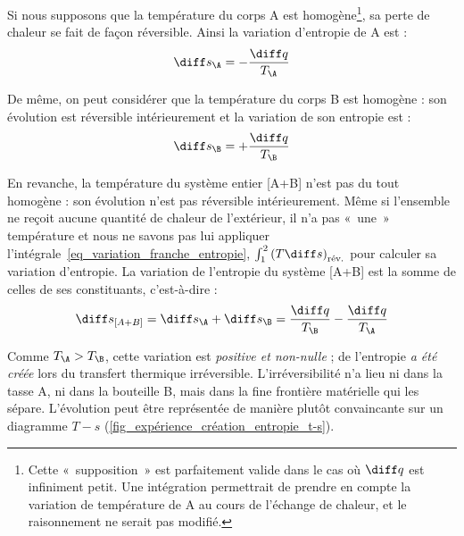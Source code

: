		Si nous supposons que la température du corps A est homogène\footnote{Cette «~supposition~» est parfaitement valide dans le cas où $\diff q$ est infiniment petit. Une intégration permettrait de prendre en compte la variation de température de A au cours de l’échange de chaleur, et le raisonnement ne serait pas modifié.},	sa perte de chaleur se fait de façon réversible. Ainsi la variation d’entropie de A est :
		\begin{equation*}
			\diff s_\A = - \frac{\diff q}{T_\A}
		\end{equation*}

		De même, on peut considérer que la température du corps B est homogène : son évolution est réversible intérieurement et la variation de son entropie est :
		\begin{equation*}
			\diff s_\B = + \frac{\diff q}{T_\B }
		\end{equation*}

		En revanche, la température du système entier [A+B] n’est pas du tout homogène : son évolution n’est pas réversible intérieurement. Même si l’ensemble ne reçoit aucune quantité de chaleur de l’extérieur, il n’a pas «~une~» température et nous ne savons pas lui appliquer l’intégrale~\ref{eq_variation_franche_entropie}, $\int_1^2 \left(T \diff s \right)_\text{rév.}$ pour calculer sa variation d’entropie. La variation de l’entropie du système [A+B] est la somme de celles de ses constituants, c’est-à-dire :
		\begin{equation}
			\diff s_{[A+B]} = \diff s_\A + \diff s_\B = \frac{\diff q}{T_\B } - \frac{\diff q}{T_\A}
		\end{equation}

		Comme $T_\A > T_\B$, cette variation est \emph{positive et non-nulle} ; de l’entropie \emph{a été créée} lors du transfert thermique irréversible. L’irréversibilité n’a lieu ni dans la tasse A, ni dans la bouteille B, mais dans la fine frontière matérielle qui les sépare. L’évolution peut être représentée de manière plutôt convaincante sur un diagramme $T-s$ (\cref{fig_expérience_création_entropie_t-s}).

